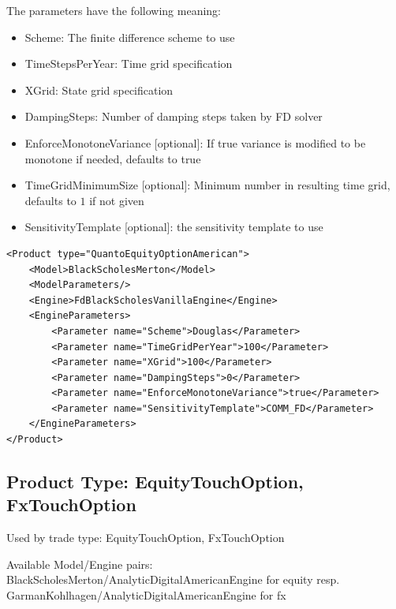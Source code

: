 The parameters have the following meaning:

\begin{itemize}
\item Scheme: The finite difference scheme to use
\item TimeStepsPerYear: Time grid specification
\item XGrid: State grid specification
\item DampingSteps: Number of damping steps taken by FD solver
\item EnforceMonotoneVariance [optional]: If true variance is modified to be monotone if needed, defaults to true
\item TimeGridMinimumSize [optional]: Minimum number in resulting time grid, defaults to $1$ if not given
\item SensitivityTemplate [optional]: the sensitivity template to use
\end{itemize}

\begin{longlisting}
\begin{verbatim}
<Product type="QuantoEquityOptionAmerican">
    <Model>BlackScholesMerton</Model>
    <ModelParameters/>
    <Engine>FdBlackScholesVanillaEngine</Engine>
    <EngineParameters>
        <Parameter name="Scheme">Douglas</Parameter>
        <Parameter name="TimeGridPerYear">100</Parameter>
        <Parameter name="XGrid">100</Parameter>
        <Parameter name="DampingSteps">0</Parameter>
        <Parameter name="EnforceMonotoneVariance">true</Parameter>
        <Parameter name="SensitivityTemplate">COMM_FD</Parameter>
    </EngineParameters>
</Product>
\end{verbatim}
\caption{Configuration for Product QuantoEquityOptionAmerican, Model BlackScholesMerton, Engine FdBlackScholesVanillaEngine}
\label{lst:peconfig_QuantoEquityOptionAmerican_BlackScholesMerton_FdBlackScholesVanillaEngine}
\end{longlisting}

\subsection{Product Type: EquityTouchOption, FxTouchOption}

Used by trade type: EquityTouchOption, FxTouchOption

Available Model/Engine pairs: BlackScholesMerton/AnalyticDigitalAmericanEngine for equity
resp. GarmanKohlhagen/AnalyticDigitalAmericanEngine for fx

